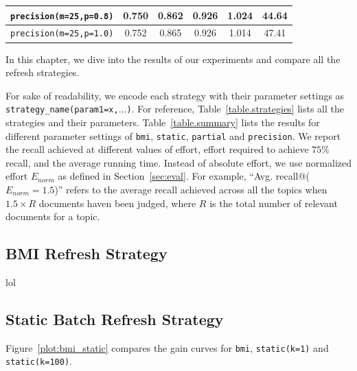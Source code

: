 \begin{table}[]
{\begin{tabular}{|c|c|c|c|c|c|}
\texttt{precision(m=25,p=0.8)} &  0.750 & 0.862 & 0.926 & 1.024 & 44.64 \\ \hline
\texttt{precision(m=25,p=1.0)} &  0.752 & 0.865 & 0.926 & 1.014 & 47.41 \\
\hline
\end{tabular}
}
\end{table}

In this chapter, we dive into the results of our experiments and compare
all the refresh strategies.

For sake of readability, we encode each strategy with their parameter
settings as \texttt{strategy\_name(param1=x,$\ldots$)}. For reference, Table~\ref{table.strategies}
lists all the strategies and their parameters. Table~\ref{table.summary} lists
the results for different parameter settings of \texttt{bmi}, \texttt{static},
\texttt{partial} and \texttt{precision}.
We report the recall achieved at different values of effort, effort required to
achieve $75\%$ recall, and the average running time. Instead of absolute effort,
we use normalized effort $E_{norm}$ as defined in Section~\ref{sec:eval}. For
example, ``Avg. recall@($E_{norm}=1.5$)'' refers to the average recall achieved
across all the topics when $1.5 \times R$ documents haven been judged, where $R$
is the total number of relevant documents for a topic.

\subsection*{BMI Refresh Strategy}
lol

\subsection*{Static Batch Refresh Strategy}
Figure~\ref{plot:bmi_static} compares the gain curves for \texttt{bmi},
\texttt{static(k=1)} and \texttt{static(k=100)}.

